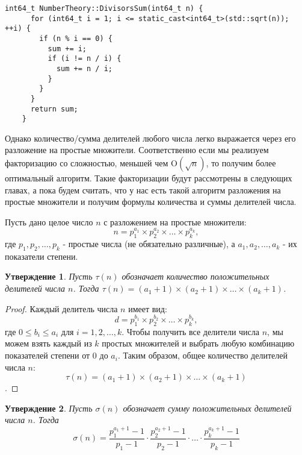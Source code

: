 \documentclass[12pt, a4paper, openany]{book}
\newtheorem*{statement}{Утверждение}
\begin{document}
\newpage
\begin{lstlisting}[breaklines=true]
    int64_t NumberTheory::DivisorsSum(int64_t n) {
      for (int64_t i = 1; i <= static_cast<int64_t>(std::sqrt(n)); ++i) {
        if (n % i == 0) {
          sum += i;
          if (i != n / i) {
            sum += n / i;
          }
        }
      }
      return sum;
    }
\end{lstlisting}

    Однако количество/сумма делителей любого числа легко выражается через его разложение на простые множители. Соответственно если мы реализуем факторизацию со сложностью, меньшей чем $\text{O}(\sqrt{n})$, то получим более оптимальный алгоритм. Такие факторизации будут рассмотрены в следующих главах, а пока будем считать, что у нас есть такой алгоритм разложения на простые множители и получим формулы количества и суммы делителей числа.

\noindent
    Пусть дано целое число $ n $ с разложением на простые множители:
    \[n = p_1^{a_1} \times p_2^{a_2} \times \ldots \times p_k^{a_k},\]
\noindent
    где $ p_1, p_2, \ldots, p_k $ - простые числа (не обязательно различные), а $ a_1, a_2, \ldots, a_k $ - их показатели степени.
    
\begin{statement}
    Пусть $\tau(n)$ обозначает количество положительных делителей числа $n$. Тогда $\tau(n) = (a_1 + 1) \times (a_2 + 1) \times \ldots \times (a_k + 1)$.
    \end{statement}
    
    \begin{proof}
    Каждый делитель числа $ n $ имеет вид:
    \[ d = p_1^{b_1} \times p_2^{b_2} \times \ldots \times p_k^{b_k},\]
    \noindent
    где $ 0 \leq b_i \leq a_i $ для $ i = 1, 2, \ldots, k $. Чтобы получить все делители числа $ n $, мы можем взять каждый из $ k $ простых множителей и выбрать любую комбинацию показателей степени от 0 до $ a_i $. Таким образом, общее количество делителей числа $ n $:
    \begin{equation}\tau(n) = (a_1 + 1) \times (a_2 + 1) \times \ldots \times (a_k + 1)\end{equation}.
\end{proof}

\newpage

\begin{statement}
    Пусть $\sigma(n)$ обозначает сумму положительных делителей числа $n$. Тогда \begin{equation}
    \sigma(n) = \frac{{p_1^{a_1+1} - 1}}{{p_1 - 1}} \cdot \frac{{p_2^{a_2+1} - 1}}{{p_2 - 1}} \cdot \ldots \cdot \frac{{p_k^{a_k+1} - 1}}{{p_k - 1}}
    \end{equation}
\end{statement}
\end{document}
